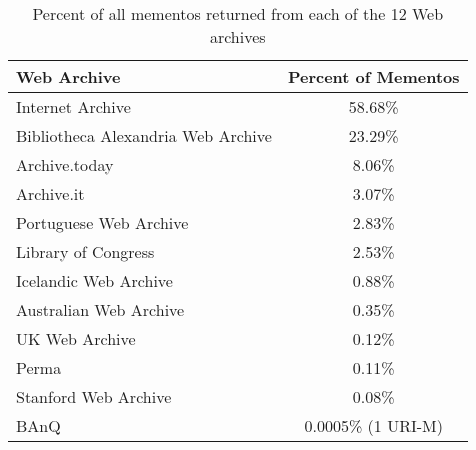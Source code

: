 \begin{table}
    \centering
    \begin{tabular}{|l|c|}
    \hline
    Web Archive & Percent of Mementos \\
    \hline
    Internet Archive & 58.68\% \\
    Bibliotheca Alexandria Web Archive & 23.29\% \\
    Archive.today & 8.06\% \\
    Archive.it & 3.07\% \\
    Portuguese Web Archive & 2.83\% \\
    Library of Congress & 2.53\% \\
    Icelandic Web Archive & 0.88\% \\
    Australian Web Archive & 0.35\% \\
    UK Web Archive & 0.12\% \\
    Perma & 0.11\% \\
    Stanford Web Archive & 0.08\% \\
    BAnQ & 0.0005\% (1 URI-M) \\ \hline
    \end{tabular}
    \caption{Percent of all mementos returned from each of the 12 Web archives}%
    \label{tab:archives}
\end{table}



